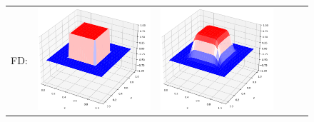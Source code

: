 \documentclass[12pt, reqno]{report}
\theoremstyle{definition}
\theoremstyle{remark}
\begin{document}
\begin{figure}[H]
\begin{tabular}{rccccc}
        FD: &
        \includegraphics[align = c, height=\subheight]{media_paper/surf_FD_n=0.png} &
        \includegraphics[align = c, height=\subheight]{media_paper/surf_FD_n=50.png} &

\end{tabular}
\end{figure}
\end{document}

